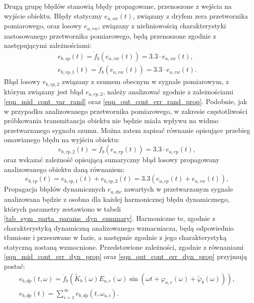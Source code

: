Drugą grupę błędów stanowią błędy propagowane, przenoszone z wejścia na wyjście obiektu. Błędy statyczny $e_{a,sw}(t)$, związany z dryfem zera przetwornika pomiarowego, oraz losowy $e_{a,rw}$, związany z nieliniowością charakterystyki zastosowanego przetwornika pomiarowego, będą przenoszone zgodnie z następującymi zależnościami:
\begin{gather}
e_{b,sp}(t) = \dot{f}_{b} \left( e_{a,sw}(t) \right) = 3.3 \cdot e_{a,sw}(t) \label{eqn_sym_partb_stat_prop_err}, \\
e_{b,rp,1}(t) = \dot{f}_{b} \left( e_{a,rw}(t) \right) = 3.3 \cdot e_{a,rw}(t) \label{eqn_sym_partb_rand_prop_err_1}.
\end{gather}
Błąd losowy $e_{b,rp,2}$ związany z szumem obecnym w sygnale pomiarowym, z którym związany jest błąd $e_{a,rp,2}$, należy analizować zgodnie z zależnościami \eqref{eqn_mid_cont_var_rand} oraz \eqref{eqn_out_cont_err_rand_prop}. Podobnie, jak w przypadku analizowanego przetwornika pomiarowego, w zakresie częstotliwości próbkowania transmitancja obiektu nie będzie miała wpływu na widmo przetwarzanego sygnału szumu. Można zatem zapisać równanie opisujące przebieg omawianego błędu na wyjściu obiektu:
\begin{equation}
e_{b,rp,2}(t) = \dot{f}_{b} \left( e_{a,rp}(t) \right) = 3.3 \cdot e_{a,rp}(t) \label{eqn_sym_partb_rand_prop_err_2},
\end{equation}
oraz wskazać zależność opisującą sumaryczny błąd losowy propagowany analizowanego obiektu daną równaniem:
\begin{equation}
e_{b,rp}(t) = e_{b,rp,1}(t) + e_{b,rp,2}(t) = 3.3 \left( e_{a,rp}(t) + e_{a,rw}(t) \right) \label{eqn_sym_partb_rand_prop_err},
\end{equation}
Propagacja błędów dynamicznych $e_{a,dw}$ zawartych w przetwarzanym sygnale analizowana będzie z osobna dla każdej harmonicznej błędu dynamicznego, których parametry zestawiono w tabeli \ref{tab_sym_parta_params_dyn_summary}. Harmoniczne te, zgodnie z charakterystyką dynamiczną analizowanego wzmacniacza, będą odpowiednio tłumione i przesuwane w fazie, a następnie zgodnie z jego charakterystyką statyczną zostaną wzmocnione. Przedstawione zależności, zgodnie z równaniami \eqref{eqn_mid_cont_err_dyn_prop} oraz \eqref{eqn_out_cont_err_dyn_prop} przyjmują postać:
\begin{gather}
e_{b,dp}(t,\omega) = \dot{f}_{b} \left( \tilde{K}_{b}(\omega) E_{a,e}(\omega) \sin \left( \omega t + \varphi_{a,e}(\omega) + \tilde{\varphi}_{b}(\omega) \right) \right) \label{eqn_sym_partb_dyn_prop_err},\\
e_{b,dp}(t) = \sum _{i = 1} ^{\infty} e_{b,dp}(t,\omega_{a,i}) \label{eqn_sym_partb_dyn_prop_sum}.
\end{gather}

